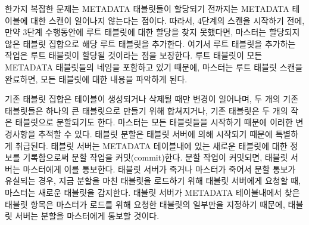 \documentclass[twocolumn]{article}
\begin{document}
한가지 복잡한 문제는 METADATA 태블릿들이 할당되기 전까지는 METADATA 테이블에 대한 스캔이 일어나지 않는다는 점이다.
따라서, 4단계의 스캔을 시작하기 전에, 만약 3단계 수행동안에 루트 태블릿에 대한 할당을 찾지 못했다면, 마스터는 할당되지 않은 태블릿 집합으로 해당 루트 태블릿을 추가한다. 여기서 루트 태블릿을 추가하는 작업은 루트 태블릿이 할당될 것이라는 점을 보장한다.
루트 태블릿이 모든 METADATA 태블릿들의 네임을 포함하고 있기 때문에, 마스터는 루트 태블릿 스캔을 완료하면, 모든 태블릿에 대한 내용을 파악하게 된다.

기존 태블릿 집합은 테이블이 생성되거나 삭제될 때만 변경이 일어나며,
두 개의 기존 태블릿들은 하나의 큰 태블릿으로 만들기 위해 합쳐지거나, 기존 태블릿은 두 개의 작은 태블릿으로 분할되기도 한다.
마스터는 모든 태블릿들을 시작하기 때문에 이러한 변경사항을 추적할 수 있다.
태블릿 분할은  태블릿 서버에 의해 시작되기 때문에 특별하게 취급된다.
태블릿 서버는 METADATA 테이블내에 있는 새로운 태블릿에 대한 정보를 기록함으로써 분할 작업을 커밋(commit)한다.
분할 작업이 커밋되면, 태블릿 서버는 마스터에게 이를 통보한다.
태블릿 서버가 죽거나 마스터가 죽어서 분할 통보가 유실되는 경우,
지금 분할을 마친 태블릿을 로드하기 위해 태블릿 서버에게 요청할 때, 마스터는 새로운 태블릿을 감지한다.
태블릿 서버가 METADATA 테이블내에서 찾은 태블릿 항목은 마스터가 로드를 위해 요청한 태블릿의 일부만을 지정하기 때문에, 
태블릿 서버는 분할을 마스터에게 통보할 것이다.
\end{document}
